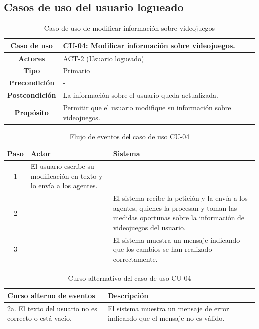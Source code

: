 \subsection{Casos de uso del usuario logueado}

\begin{table}[H]
\centering
\begin{tabular}{|c|p{10cm}|}
\hline
\rowcolor{green!40} \textbf{Caso de uso} & CU-04: Modificar información sobre videojuegos. \\ \hline
\rowcolor{blue!10} \textbf{Actores} & ACT-2 (Usuario logueado) \\ \hline
\rowcolor{blue!10} \textbf{Tipo} & Primario \\ \hline
\rowcolor{blue!10} \textbf{Precondición} & - \\ \hline
\rowcolor{blue!10} \textbf{Postcondición} & La información sobre el usuario queda actualizada. \\ \hline
\rowcolor{blue!10} \textbf{Propósito} & Permitir que el usuario modifique su información sobre videojuegos. \\ \hline
\end{tabular}
\caption{Caso de uso de modificar información sobre videojuegos}
\end{table}

\begin{table}[H]
\centering
\begin{tabular}{|c|p{5cm}|p{5cm}|}
\hline
\rowcolor{green!40} \textbf{Paso} & \textbf{Actor} & \textbf{Sistema} \\ \hline
\rowcolor{blue!10} 1 & El usuario escribe su modificación en texto y lo envía a los agentes. &  \\ \hline
\rowcolor{blue!10} 2 &  & El sistema recibe la petición y la envía a los agentes, quienes la procesan y toman las medidas oportunas sobre la información de videojuegos del usuario. \\ \hline
\rowcolor{blue!10} 3 &  & El sistema muestra un mensaje indicando que los cambios se han realizado correctamente. \\ \hline
\end{tabular}
\caption{Flujo de eventos del caso de uso CU-04}
\end{table}

\begin{table}[H]
\centering
\begin{tabular}{|p{4cm}|p{8cm}|}
\hline
\rowcolor{green!40} \textbf{Curso alterno de eventos} & \textbf{Descripción} \\ \hline
\rowcolor{blue!10} 2a. El texto del usuario no es correcto o está vacío. & El sistema muestra un mensaje de error indicando que el mensaje no es válido. \\ \hline
\end{tabular}
\caption{Curso alternativo del caso de uso CU-04}
\end{table}

